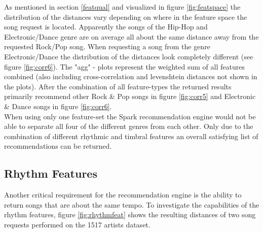 \noindent As mentioned in section \ref{featqual} and visualized in figure \ref{fig:featspace} the distribution of the distances vary depending on where in the feature space the song request is located. Apparently the songs of the Hip-Hop and Electronic/Dance genre are on average all about the same distance away from the requested Rock/Pop song. When requesting a song from the genre Electronic/Dance the distribution of the distances look completely different (see figure \ref{fig:corr6}).
\noindent The "agg" - plots represent the weighted sum of all features combined (also including cross-correlation and levenshtein distances not shown in the plots). After the combination of all feature-types the returned results primarily recommend other Rock \& Pop songs in figure \ref{fig:corr5} and Electronic \& Dance songs in figure \ref{fig:corr6}.\\
When using only one feature-set the Spark recommendation engine would not be able to separate all four of the different genres from each other. Only due to the combination of different rhythmic and timbral features an overall satisfying list of recommendations can be returned.\\

\subsection{Rhythm Features}\label{rhythmrec}

Another critical requirement for the recommendation engine is the ability to return songs that are about the same tempo. To investigate the capabilities of the rhythm features, figure \ref{fig:rhythmfeat} shows the resulting distances of two song requests performed on the 1517 artists dataset.

